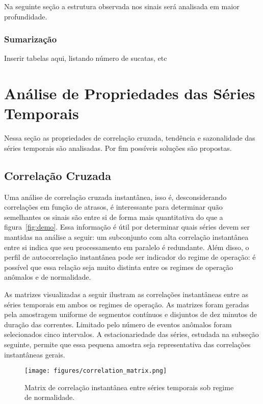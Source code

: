 Na seguinte seção a estrutura observada nos sinais será analisada em maior
profundidade.


\subsubsection{Sumarização}

Inserir tabelas aqui, listando número de sucatas, etc

\section{Análise de Propriedades das Séries Temporais}

Nessa seção as propriedades de correlação cruzada, tendência e sazonalidade
das séries temporais são analisadas. Por fim possíveis soluções são propostas.

\subsection{Correlação Cruzada}\label{ssec:ccorr}

Uma análise de correlação cruzada instantânea, isso é, desconsiderando
correlações em função de atrasos, é interessante para determinar quão
semelhantes os sinais são entre si de forma mais quantitativa do que a
figura~\ref{fig:demo}. Essa informação é útil por determinar quais séries devem
ser mantidas na análise a seguir: um subconjunto com alta correlação
instantânea entre si indica que seu processamento em paralelo é redundante.
Além disso, o perfil de autocorrelação instantânea pode ser indicador do regime
de operação: é possível que essa relação seja muito distinta entre os regimes
de operação anômalos e de normalidade.

As matrizes visualizadas a seguir ilustram as correlações instantâneas entre as
séries temporais em ambos os regimes de operação. As matrizes foram geradas
pela amostragem uniforme de segmentos contínuos e disjuntos de dez minutos de
duração das correntes. Limitado pelo número de eventos anômalos foram
selecionados cinco intervalos. A estacionariedade das séries, estudada na
subseção seguinte, permite que essa pequena amostra seja representativa das
correlações instantâneas gerais.

\begin{figure}[H]
    \centering
    \texttt{[image: figures/correlation\_matrix.png]}
    \caption{Matrix de correlação instantânea entre séries temporais sob
    regime de normalidade.}
    \label{fig:demo_matrix}
\end{figure}

